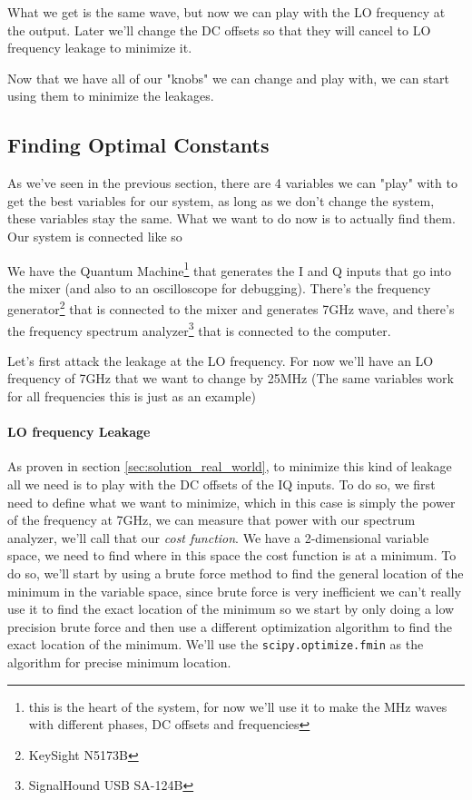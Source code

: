What we get is the same wave, but now we can play with the LO frequency at the output. Later we'll change the DC offsets so that they will cancel to LO frequency leakage to minimize it.

Now that we have all of our "knobs" we can change and play with, we can start using them to minimize the leakages.


\subsection{Finding Optimal Constants} %
As we've seen in the previous section, there are 4 variables we can "play" with to get the best variables for our system, as long as we don't change the system, these variables stay the same. What we want to do now is to actually find them. Our system is connected like so

We have the Quantum Machine\footnote{this is the heart of the system, for now we'll use it to make the MHz waves with different phases, DC offsets and frequencies} that generates the I and Q inputs that go into the mixer (and also to an oscilloscope for debugging). There's the frequency generator\footnote{KeySight N5173B} that is connected to the mixer and generates 7GHz wave, and there's the frequency spectrum analyzer\footnote{SignalHound USB SA-124B} that is connected to the computer.

Let's first attack the leakage at the LO frequency. For now we'll have an LO frequency of 7GHz that we want to change by 25MHz (The same variables work for all frequencies this is just as an example)

\paragraph{LO frequency Leakage}
As proven in section \ref{sec:solution_real_world}, to minimize this kind of leakage all we need is to play with the DC offsets of the IQ inputs. To do so, we first need to define what we want to minimize, which in this case is simply the power of the frequency at 7GHz, we can measure that power with our spectrum analyzer, we'll call that our \textit{cost function}.
We have a 2-dimensional variable space, we need to find where in this space the cost function is at a minimum. To do so, we'll start by using a brute force method to find the general location of the minimum in the variable space, since brute force is very inefficient we can't really use it to find the exact location of the minimum so we start by only doing a low precision brute force and then use a different optimization algorithm to find the exact location of the minimum. We'll use the \texttt{scipy.optimize.fmin} as the algorithm for precise minimum location.

